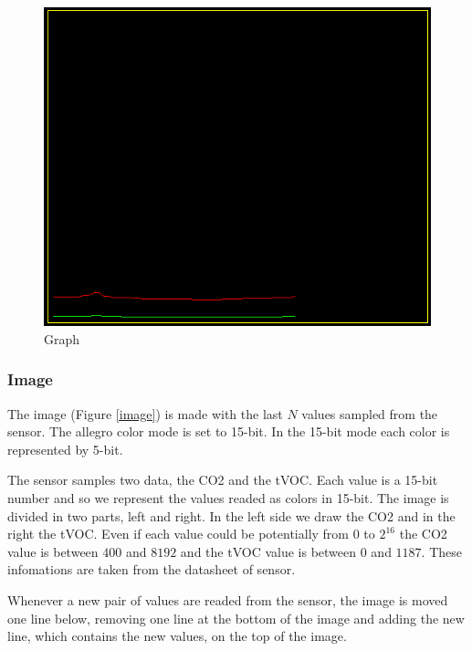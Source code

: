 \documentclass[12pt]{article}
\begin{document}
\begin{figure}[H]
    \centering
    \includegraphics[scale=0.60]{images/graph.png}
    \caption{Graph }
    \label{graph}
\end{figure}

\subsubsection*{Image}
The image (Figure \ref{image}) is made with the last $N$ values sampled from
the sensor. The allegro color mode is set to 15-bit. In the 15-bit mode each
color is represented by 5-bit.

The sensor samples two data, the CO2 and the tVOC. Each value is a 15-bit
number and so we represent the values readed as colors in 15-bit. The image
is divided in two parts, left and right. In the left side we draw the CO2
and in the right the tVOC. Even if each value could be potentially from $0$ to 
$2^{16}$ the CO2 value is between $400$ and $8192$ and the tVOC value is between
$0$ and $1187$. These infomations are taken from the datasheet of sensor.

Whenever a new pair of values are readed from the sensor, the image is moved
one line below, removing one line at the bottom of the image and adding the
new line, which contains the new values, on the top of the image.
\end{document}
